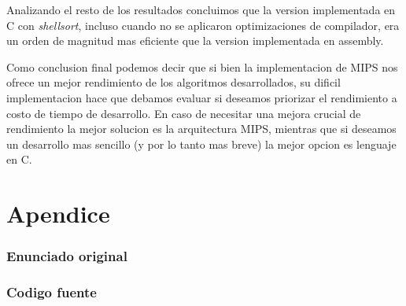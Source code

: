 \documentclass[a4paper,11pt]{article}
\begin{document}
Analizando el resto de los resultados concluimos que la version implementada en
C con \textit{shellsort}, incluso cuando no se aplicaron optimizaciones de
compilador, era un orden de magnitud mas eficiente que la version implementada
en assembly. 

Como conclusion final podemos decir que si bien la implementacion de MIPS nos ofrece un mejor rendimiento de los algoritmos desarrollados, su dificil implementacion hace que debamos evaluar si deseamos priorizar el rendimiento a costo de tiempo de desarrollo. En caso de necesitar una mejora crucial de rendimiento la mejor solucion es la arquitectura MIPS, mientras que si deseamos un desarrollo mas sencillo (y por lo tanto mas breve) la mejor opcion es lenguaje en C.

\clearpage

\part{Apendice}
\appendix

\section{Enunciado original}\label{sec:enunciado}


\clearpage
\section{Codigo fuente}\label{sec:source}
\clearpage
{}

%
%
\end{document}
